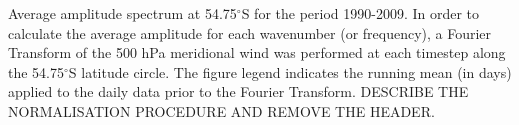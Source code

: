 \label{fig:fourier_spectrum}
Average amplitude spectrum at 54.75$^{\circ}$S for the period 1990-2009. In order to calculate the average amplitude for each wavenumber (or frequency), a Fourier Transform of the 500 hPa meridional wind was performed at each timestep along the 54.75$^{\circ}$S latitude circle. The figure legend indicates the running mean (in days) applied to the daily data prior to the Fourier Transform. DESCRIBE THE NORMALISATION PROCEDURE AND REMOVE THE HEADER.  